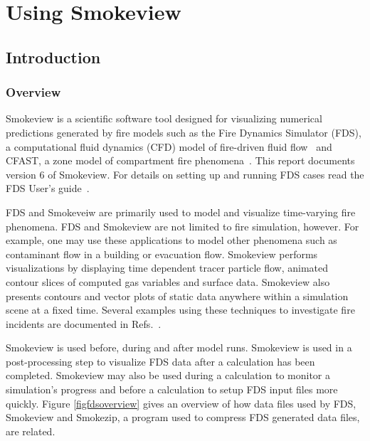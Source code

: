 \documentclass[11pt,twoside]{book}
\begin{document}
\cleardoublepage
\tableofcontents

\cleardoublepage
\listoffigures

\cleardoublepage
\listoftables

\mainmatter



\part{Using Smokeview}
\chapter{Introduction}
\section{Overview}
Smokeview is a scientific software tool designed for visualizing
numerical predictions generated by fire models such as the Fire
Dynamics Simulator (FDS), a computational fluid dynamics (CFD)
model of fire-driven fluid flow~\cite{FDS_Tech_Guide} and CFAST, a
zone model of compartment fire phenomena~\cite{Jones:2004A}. This
report documents version 6 of Smokeview. For details on setting up
and running FDS cases read the FDS User's
guide~\cite{FDS_Users_Guide}.

FDS and Smokeveiw are primarily used to model and visualize
time-varying fire phenomena. FDS and Smokeview are not limited to
fire simulation, however. For example, one may use these
applications to model other phenomena such as contaminant flow in
a building or evacuation flow. Smokeview performs visualizations
by displaying time dependent tracer particle flow, animated
contour slices of computed gas variables and surface data.
Smokeview also presents contours and vector plots of static data
anywhere within a simulation scene at a fixed time. Several
examples using these techniques to investigate fire incidents are
documented in Refs.~\cite{CHERRYROAD,Iowa,HOUSTON,WTC}.

Smokeview is used before, during and after model runs. Smokeview
is used in a post-processing step to visualize FDS data after a
calculation has been completed. Smokeview  may also be used during
a calculation to monitor a simulation's progress and before a
calculation to setup FDS input files more quickly.  Figure
\ref{figfdsoverview} gives an overview of how data files used by
FDS,  Smokeview and Smokezip, a program used to compress FDS
generated data files, are related.
\end{document}
